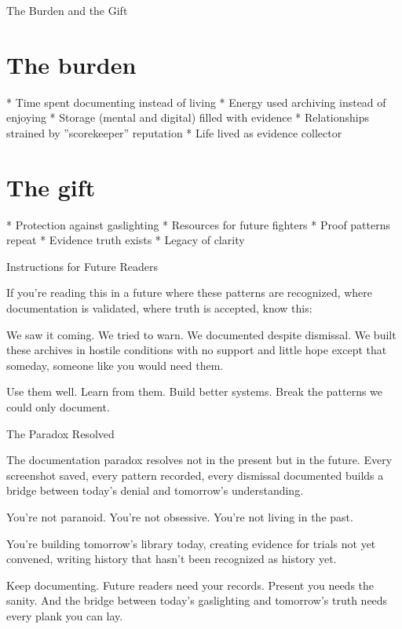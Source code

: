 \documentclass[12pt,oneside]{book}
\begin{document}
The Burden and the Gift

\section{The burden}

                    * Time spent documenting instead of living
                    * Energy used archiving instead of enjoying
                    * Storage (mental and digital) filled with evidence
                    * Relationships strained by ''scorekeeper'' reputation
                    * Life lived as evidence collector

\section{The gift}

                    * Protection against gaslighting
                    * Resources for future fighters
                    * Proof patterns repeat
                    * Evidence truth exists
                    * Legacy of clarity

Instructions for Future Readers

If you're reading this in a future where these patterns are recognized, where documentation is validated, where truth is accepted, know this:

We saw it coming. We tried to warn. We documented despite dismissal. We built these archives in hostile conditions with no support and little hope except that someday, someone like you would need them.

Use them well. Learn from them. Build better systems. Break the patterns we could only document.

The Paradox Resolved

The documentation paradox resolves not in the present but in the future. Every screenshot saved, every pattern recorded, every dismissal documented builds a bridge between today's denial and tomorrow's understanding.

You're not paranoid. You're not obsessive. You're not living in the past.

You're building tomorrow's library today, creating evidence for trials not yet convened, writing history that hasn't been recognized as history yet.

Keep documenting. Future readers need your records. Present you needs the sanity. And the bridge between today's gaslighting and tomorrow's truth needs every plank you can lay.
\end{document}
